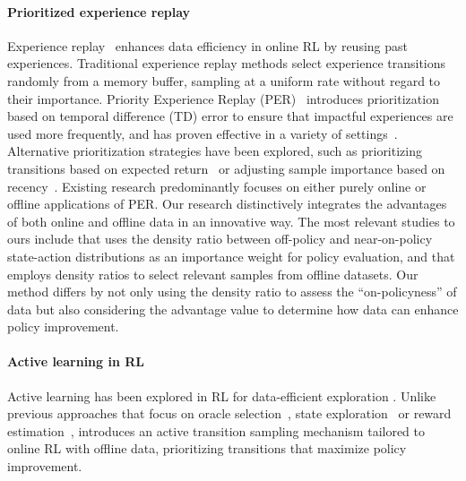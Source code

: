 \paragraph{Prioritized experience replay}
\vspace{-0.3cm}
Experience replay~\citep{lin1992self} enhances data efficiency in online RL by reusing past experiences.
Traditional experience replay methods select experience transitions randomly from a memory buffer, sampling at a uniform rate without regard to their importance. %
Priority Experience Replay (PER)~\citep{schaul2015prioritized} introduces prioritization based on temporal difference (TD) error to ensure that impactful experiences are used more frequently, and has proven effective in a variety of settings~\citep{jaderberg2016reinforcement, wang2016dueling, nair2018overcoming, hessel2018rainbow, oh2021model, saglam2022actor, yue2023offline, tian2023learning}. 
Alternative prioritization strategies have been explored, such as prioritizing transitions based on expected return~\citep{isele2018selective} or adjusting sample importance based on recency~\citep{fedus2020revisiting}. 
Existing research predominantly focuses on either purely online or offline applications of PER. Our research distinctively integrates the advantages of both online and offline data in an innovative way. The most relevant studies to ours include \citet{sinha2022experience} that uses the density ratio between off-policy and near-on-policy state-action distributions as an importance weight for policy evaluation, and \citet{lee2022offline} that employs density ratios to select relevant samples from offline datasets. Our method differs by not only using the density ratio to assess the ``on-policyness'' of data but also considering the advantage value to determine how data can enhance policy improvement.


\paragraph{Active learning in RL}
\vspace{-0.3cm}
Active learning has been explored in RL for data-efficient exploration %
\citep{epshteyn2008active,lopes2009active,  fang2017learning, krueger2020active, liu2022cost,liu2023active,liu2023blending}. %
Unlike previous approaches that focus on %
oracle selection~\citep{liu2023active,liu2023blending}, state exploration~\citep{epshteyn2008active,liu2023active} or reward estimation~\citep{lopes2009active},
\algname introduces an active transition sampling mechanism tailored to online RL with offline data, prioritizing transitions that maximize policy improvement.





















